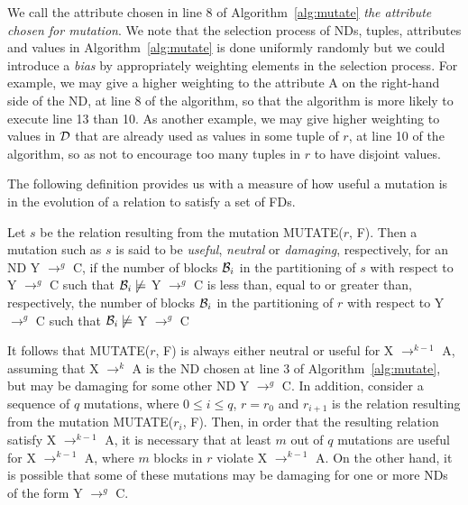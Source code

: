 We call the attribute chosen in line 8 of Algorithm~\ref{alg:mutate}
{\em the attribute chosen for mutation}.
We note that the selection process of NDs, tuples, attributes and values
in Algorithm~\ref{alg:mutate} is done uniformly randomly but 
we could introduce a {\em bias} by appropriately weighting 
elements in the selection process. For example, we may give a higher weighting
to the attribute A on the right-hand side of the ND,
at line 8 of the algorithm, so that the algorithm is more likely to 
execute line 13 than 10. As another example, we may give
higher weighting to values in $\cal D$ that are already used as values in
 some tuple of $r$, at line 10 of the algorithm, so as not to encourage
 too many tuples in $r$ to have disjoint values.

\smallskip

The following definition provides us with a measure of how useful a mutation 
is in the evolution of a relation to satisfy a set of FDs.

\begin{definition}
\begin{rm}
Let $s$ be the relation resulting from the mutation MUTATE($r$, F).
Then a mutation such as $s$ is said to be {\em useful}, {\em neutral} or 
{\em damaging}, respectively, for an ND Y $\to^g$ C,
if the number of blocks ${\cal B}_i$
in the partitioning of $s$ with respect to Y $\to^g$ C
such that ${\cal B}_i \not\models$ Y $\to^g$ C
is less than, equal to or greater than, respectively, 
the number of blocks ${\cal B}_i$ 
in the partitioning of $r$ with respect to Y $\to^g$ C
such that ${\cal B}_i \not\models$ Y $\to^g$ C
\end{rm}
\end{definition}
\medskip

It follows that MUTATE($r$, F) is always either neutral or useful for 
X $\to^{k-1}$ A, assuming that 
X $\to^k$ A is the ND chosen at line 3 of Algorithm~\ref{alg:mutate},
but may be damaging for some other ND Y $\to^g$ C.
In addition, consider a sequence of $q$ mutations, where
$0 \le i \le q$, $r = r_0$ and $r_{i+1}$ is the relation resulting from
the mutation MUTATE($r_i$, F).
Then, in order that the resulting relation satisfy X $\to^{k-1}$ A,
it is necessary that at least $m$ out of $q$ mutations are useful for 
X $\to^{k-1}$ A, where $m$ blocks in $r$ violate X $\to^{k-1}$ A.
On the other hand, it is possible that some of these mutations may 
be damaging for one or more NDs of the form Y $\to^g$ C.

